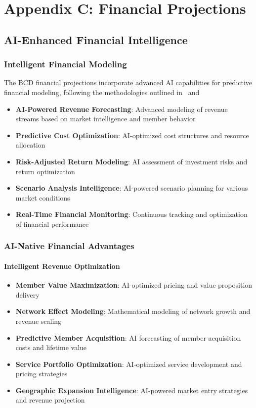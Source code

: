 \documentclass[12pt,a4paper]{book}
\begin{document}
\chapter{Appendix C: Financial Projections}

\section{AI-Enhanced Financial Intelligence}

\subsection{Intelligent Financial Modeling}

The BCD financial projections incorporate advanced AI capabilities for predictive financial modeling, following the methodologies outlined in \ and \:

\begin{itemize}
    \item \textbf{AI-Powered Revenue Forecasting}: Advanced modeling of revenue streams based on market intelligence and member behavior
    \item \textbf{Predictive Cost Optimization}: AI-optimized cost structures and resource allocation
    \item \textbf{Risk-Adjusted Return Modeling}: AI assessment of investment risks and return optimization
    \item \textbf{Scenario Analysis Intelligence}: AI-powered scenario planning for various market conditions
    \item \textbf{Real-Time Financial Monitoring}: Continuous tracking and optimization of financial performance
\end{itemize}

\subsection{AI-Native Financial Advantages}

\subsubsection{Intelligent Revenue Optimization}

\begin{itemize}
    \item \textbf{Member Value Maximization}: AI-optimized pricing and value proposition delivery
    \item \textbf{Network Effect Modeling}: Mathematical modeling of network growth and revenue scaling
    \item \textbf{Predictive Member Acquisition}: AI forecasting of member acquisition costs and lifetime value
    \item \textbf{Service Portfolio Optimization}: AI-optimized service development and pricing strategies
    \item \textbf{Geographic Expansion Intelligence}: AI-powered market entry strategies and revenue projection
\end{itemize}
\end{document}
